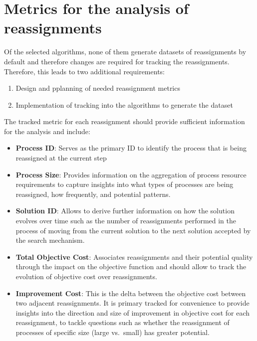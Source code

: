 \documentclass[a4paper,12pt]{Classes/RoboticsLaTeX}
\begin{document}
\section{Metrics for the analysis of reassignments}

Of the selected algorithms, none of them generate datasets of reassignments by default and therefore changes are required for tracking the reassignments.
Therefore, this leads to two additional requirements: 
\begin{enumerate}\def\labelenumi{\arabic{enumi}.}
\item Design and pplanning of needed reassignment metrics
\item Implementation of tracking into the algorithms to generate the dataset
\end{enumerate}

The tracked metric for each reassignment should provide sufficient information for the analysis and include:

\begin{itemize} \setlength\itemsep{0em} \setlength\parskip{0pt} \setlength\parsep{0pt}
\item
  \textbf{Process ID}: Serves as the primary ID to identify the process
  that is being reassigned at the current step
\item
  \textbf{Process Size}: Provides information on the aggregation of
  process resource requirements to capture insights into what types of
  processes are being reassigned, how frequently, and potential
  patterns.
\item
  \textbf{Solution ID}: Allows to derive further information on how the
  solution evolves over time such as the number of reassignments
  performed in the process of moving from the current solution to the
  next solution accepted by the search mechanism.
\item
  \textbf{Total Objective Cost}: Associates reassignments and their
  potential quality through the impact on the objective function and
  should allow to track the evolution of objective cost over
  reassignments.
\item
  \textbf{Improvement Cost}: This is the delta between the objective
  cost between two adjacent reassignments. It is primary tracked for
  convenience to provide insights into the direction and size of
  improvement in objective cost for each reassignment, to tackle
  questions such as whether the reassignment of processes of specific
  size (large vs.~small) has greater potential.
\end{itemize}
\end{document}
